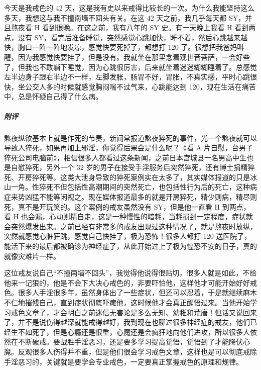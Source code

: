 \begin{case}
    今天是我戒色的 42 天，这是我有史以来戒得比较长的一次。为什么我能坚持这么多天，我想这与我不撞南墙不回头有关。在这 42 天之前，我几乎每天都 SY，并且熬夜看 H 看到很晚。在这之前，我有八年的 SY 史。有一天晚上我看 H 看到两点，没有 SY，看完后准备睡觉，突然感觉心跳加快，睡不着，然后心跳越来越快，胸口一阵一阵地发凉，感觉快要死掉了，都想打 120 了。很想把我爸妈叫醒，因为我感觉快要挂了，但是没有。我就坐在那里念着观世音菩萨，一会好些了，但我也不敢躺下睡觉，因为心跳很厉害，后来就坐着迷迷糊糊睡着了。总感觉左半边身子跟右半边不一样，左脚发胀，肠胃不好，胃胀，不真实感，平时心跳很快，坐公交人多的时候就感觉胸闷喘不过气来，心跳能达到 120，现在生活在痛苦中，总是怀疑自己得了什么病。
    \subparagraph{附评} 熬夜纵欲基本上就是作死的节奏，新闻常报道熬夜猝死的事件，光一个熬夜就可以导致人猝死，如果再加上邪淫，你觉得后果会是什么呢？《看 A 片自慰，台男子猝死公司电脑前》，相信很多人都看过这条新闻，之前日本宫城县一名男高中生也是自慰猝死，另外一个 32 岁的男子在接受手淫服务后突然猝死，还有博士捐精猝死、开房猝死等，这类大泄身导致的猝死案例实在太多了，其实媒体报道的只是冰山一角。性猝死不但包括性高潮期间的突然死亡，也包括性行为后的死亡，这种病症来势凶猛不能等闲视之。现在媒体报道最多的就是开房猝死，精少则病，精尽则死，真不是开玩笑的。这个案例的戒友虽然没有 SY，但是他一直看 H 到两点，看 H 也会漏，心动则精自走，这是一种慢性的暗耗，当耗损到一定程度，症状就会突然爆发出来。之前已经有非常多的戒友出现过这种情况了，就是熬夜时放纵，突然就感觉心脏狂跳，感觉自己快挂了，极为恐怖！很多人都打 120 送医院了，能活下来的最后都被确诊为神经症了，从此开始过上了极为惶恐不安的日子，真的就像灾难片一样。

    这位戒友说自己“不撞南墙不回头”，我觉得他说得很贴切，很多人就是如此，不给他来一记狠的，他是不会下大决心戒色的，非要吓怕他，这样他才可能开始好好戒色。很多人手淫很多年，虽然身体出了一些症状，但还可以忍着，于是就继续麻木不仁地摧残自己，直到症状彻底吓瘫他，这时候他才会真正醒悟过来。当他开始学习戒色文章了，才会明白之前迷信无害论是多么无知、幼稚和荒唐！但话又说回来了，并不是说伤得越深就能戒得越好，我到现在也聊过很多神经症的戒友，他们已经生不如死了，但是心瘾还是很重，心魔还是会疯狂地向他们进攻，所以很多人依然在不断破戒。要战胜手淫恶习，还是要多学习提高觉悟，觉悟到了才能降伏心魔。反观很多人伤得并不重，但是他们很会学习戒色文章，这样也是可以彻底戒除手淫恶习的，关键就是要学会专业戒色，一定要真正掌握戒色的原理和规律。
\end{case}


